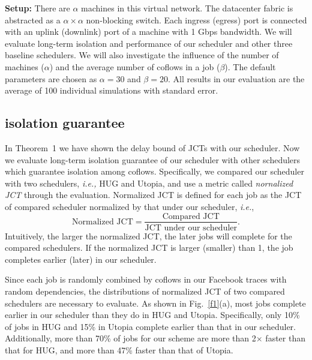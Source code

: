\documentclass[10pt,journal,compsoc]{IEEEtran}
\begin{document}
\noindent\textbf{Setup:} There are $\alpha$ machines in this virtual network.
%
The datacenter fabric is abstracted as a $\alpha \times \alpha$ non-blocking switch.
%
Each ingress (egress) port is connected with an uplink (downlink) port of a machine with 1 Gbps bandwidth.
We will evaluate long-term isolation and performance of our scheduler and other three baseline schedulers.
%
We will also investigate the influence of the number of machines ($\alpha$) and the average number of coflows in a job ($\beta$).
%
The default parameters are chosen as $\alpha = 30$ and $\beta = 20$.
%
All results in our evaluation are the average of 100 individual simulations with standard error.


\subsection{isolation guarantee}
In Theorem~1 we have shown the delay bound of JCTs with our scheduler.
%
Now we evaluate long-term isolation guarantee of our scheduler with other schedulers which guarantee isolation among coflows.
%
Specifically, we compared our scheduler with two schedulers, \emph{i.e.,} HUG and Utopia, and use a metric called \emph{nornalized JCT} through the evaluation.
%
Normalized JCT is defined for each job as the JCT of compared scheduler normalized by that under our scheduler, \emph{i.e.},
\[\text{Normalized JCT} = \frac{\text{Compared JCT}}{\text{JCT under our scheduler}}.\]
%
Intuitively, the larger the normalized JCT, the later jobs will complete for the compared schedulers.
%
If the normalized JCT is larger (smaller) than 1, the job completes earlier (later) in our scheduler.

Since each job is randomly combined by coflows in our Facebook traces with random dependencies, the distributions of normalized JCT of two compared schedulers are necessary to evaluate.
%
As shown in Fig.~\ref{f1}(a), most jobs complete earlier in our scheduler than they do in HUG and Utopia.
%
Specifically, only 10\% of jobs in HUG and 15\% in Utopia complete earlier than that in our scheduler.
%
Additionally, more than 70\% of jobs for our scheme are more than 2$\times$ faster than that for HUG, and more than 47\% faster than that of Utopia.
\end{document}

